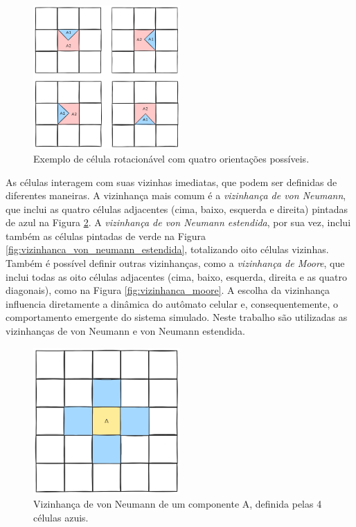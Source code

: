 \documentclass[12pt,oneside]{report}
\begin{document}
\begin{figure}[H]
    \centering
    \includegraphics[width=0.5\textwidth]{componente_rotaciona.png}
    \caption{\small Exemplo de célula rotacionável com quatro orientações possíveis.}
    \label{fig:celula_rotacionavel}
\end{figure}

As células interagem com suas vizinhas imediatas, que podem ser definidas de diferentes maneiras. A vizinhança mais comum é a \textit{vizinhança de von Neumann}, que inclui as quatro células adjacentes (cima, baixo, esquerda e direita) pintadas de azul na Figura \ref{fig:vizinhanca_von_neumann}. A \textit{vizinhança de von Neumann estendida}, por sua vez, inclui também as células pintadas de verde na Figura \ref{fig:vizinhanca_von_neumann_estendida}, totalizando oito células vizinhas. Também é possível definir outras vizinhanças, como a \textit{vizinhança de Moore}, que inclui todas as oito células adjacentes (cima, baixo, esquerda, direita e as quatro diagonais), como na Figura \ref{fig:vizinhanca_moore}. A escolha da vizinhança influencia diretamente a dinâmica do autômato celular e, consequentemente, o comportamento emergente do sistema simulado. Neste trabalho são utilizadas as vizinhanças de von Neumann e von Neumann estendida.

\begin{figure}[H]
    \centering
    \includegraphics[width=0.5\textwidth]{vizinhanca_von_neumann.png}
    \caption{\small Vizinhança de von Neumann de um componente A, definida pelas 4 células azuis.}
    \label{fig:vizinhanca_von_neumann}
\end{figure}
\end{document}
